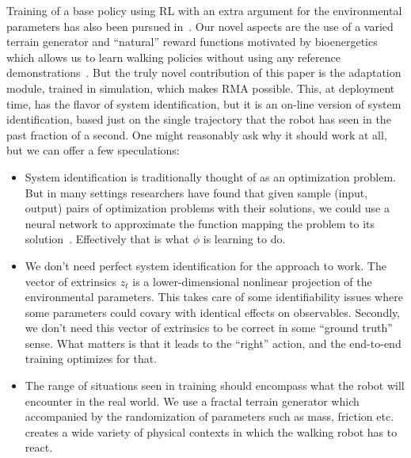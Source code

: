 \documentclass[conference]{IEEEtran}
\newcommand{\aravind}[1]{{\color{blue} {Aravind: {#1}}}}
\begin{document}
Training of a base policy using RL with an extra argument for the environmental parameters has also been pursued in~\cite{yu2017preparing,peng2020learning}. Our novel aspects are the use of a varied terrain generator and “natural” reward functions motivated by bioenergetics which allows us to learn walking policies without using any reference demonstrations~\cite{peng2020learning}. But the truly novel contribution of this paper is the adaptation module, trained in simulation, which makes RMA possible. This, at deployment time, has the flavor of system identification, but it is an on-line version of system identification, based just on the single trajectory that the robot has seen in the past fraction of a second. 
One might reasonably ask why it should work at all, but we can offer a few speculations:
\begin{itemize}
\item System identification is traditionally thought of as an optimization problem. But in many settings researchers have found that given sample (input, output) pairs of optimization problems with their solutions, we could use a neural network to approximate the function mapping the problem to its solution~\cite{ahmed2009surrogate,guo2016convolutional}. Effectively that is what $\phi$ is learning to do. 
\item We don’t need perfect system identification for the approach to work.  The vector of extrinsics $z_t$ is a lower-dimensional nonlinear projection of the  environmental parameters. This takes care of some identifiability issues where some parameters could covary with identical effects on observables. Secondly, we don’t need this vector of extrinsics to be correct in some “ground truth” sense. What matters is that it leads to the “right” action, and the end-to-end training optimizes for that.
\item The range of situations seen in training should encompass
what the robot will encounter in the real world. We use a fractal terrain generator which accompanied by the randomization of parameters such as mass, friction etc. creates a wide variety of physical contexts in which the walking robot has to react. 
\end{itemize}
\end{document}
